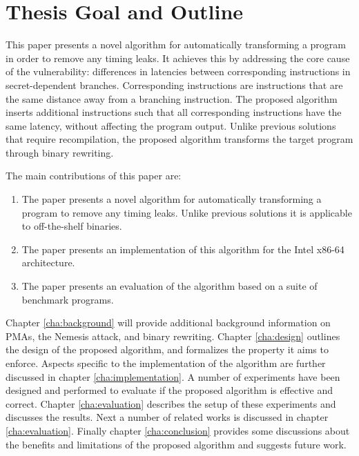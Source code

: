 \section{Thesis Goal and Outline}
This paper presents a novel algorithm for automatically transforming a program in order to remove any timing leaks. It achieves this by addressing the core cause of the vulnerability: differences in 
latencies between corresponding instructions in secret-dependent branches. Corresponding instructions are instructions that are the same distance away from a branching instruction. 
The proposed algorithm inserts additional instructions such that all corresponding instructions have the same latency, without affecting the program output. 
Unlike previous solutions that require recompilation, the proposed algorithm transforms the target program through binary rewriting. 

The main contributions of this paper are:
\begin{enumerate}
\item The paper presents a novel algorithm for automatically transforming a program to remove any timing leaks. Unlike previous solutions it is applicable to off-the-shelf binaries. 
\item The paper presents an implementation of this algorithm for the Intel x86-64 architecture. 
\item The paper presents an evaluation of the algorithm based on a suite of benchmark programs. 
\end{enumerate}

Chapter \ref{cha:background} will provide additional background information on PMAs, the Nemesis attack, and binary rewriting. 
Chapter \ref{cha:design} outlines the design of the proposed algorithm, and formalizes the property it aims to enforce.  
Aspects specific to the implementation of the algorithm are further discussed in chapter \ref{cha:implementation}. 
A number of experiments have been designed and performed to evaluate if the proposed algorithm is effective and correct. 
Chapter \ref{cha:evaluation} describes the setup of these experiments and discusses the results. 
Next a number of related works is discussed in chapter \ref{cha:evaluation}.
Finally chapter \ref{cha:conclusion} provides some discussions about the benefits and limitations of the proposed algorithm and suggests 
future work. 
